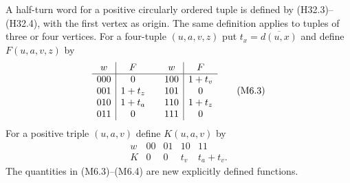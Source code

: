 \documentclass[11pt,oneside]{report}
\theoremstyle{definition}
\numberwithin{equation}{section}
\begin{document}
A half-turn word for a positive circularly ordered tuple is defined by
(H32.3)--(H32.4), with the first vertex as origin.
The same definition applies to tuples of three or four vertices.
For a four-tuple $(u,a,v,z)$ put $t_x=\overline{d(u,x)}$ and define
$F(u,a,v,z)$ by
\[
\begin{array}{c|c@{\qquad}c|c}
 w&F&w&F\\ \hline
 000&0&100&1+t_v\\
 001&1+t_z&101&0\\
 010&1+t_a&110&1+t_z\\
 011&0&111&0
\end{array}
 \tag{M6.3}
\]
For a positive triple $(u,a,v)$ define $K(u,a,v)$ by
\[
\begin{array}{c|cccc}
 w&00&01&10&11\\ \hline
 K&0&0&t_v&t_a+t_v.
\end{array}
 \tag{M6.4}
\]
The quantities in (M6.3)--(M6.4) are new explicitly defined functions.
\end{document}
